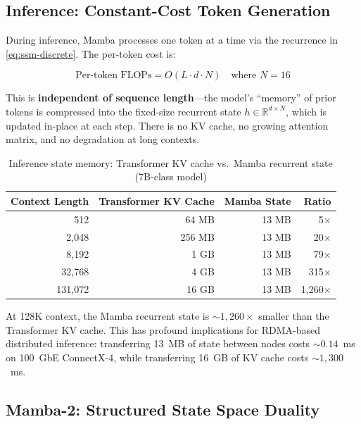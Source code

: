 \documentclass[11pt,letterpaper]{article}
\begin{document}
\subsection{Inference: Constant-Cost Token Generation}

During inference, Mamba processes one token at a time via the recurrence in \cref{eq:ssm-discrete}. The per-token cost is:

\begin{equation}
    \text{Per-token FLOPs} = O(L \cdot d \cdot N) \quad \text{where } N = 16
    \label{eq:mamba-cost}
\end{equation}

This is \textbf{independent of sequence length}---the model's ``memory'' of prior tokens is compressed into the fixed-size recurrent state $h \in \mathbb{R}^{d \times N}$, which is updated in-place at each step. There is no KV cache, no growing attention matrix, and no degradation at long contexts.

\begin{table}[htbp]
\centering
\caption{Inference state memory: Transformer KV cache vs.\ Mamba recurrent state (7B-class model)}
\label{tab:state-memory}
\begin{tabular}{@{}rrrr@{}}
\toprule
\textbf{Context Length} & \textbf{Transformer KV Cache} & \textbf{Mamba State} & \textbf{Ratio} \\
\midrule
512 & 64 MB & 13 MB & 5$\times$ \\
2,048 & 256 MB & 13 MB & 20$\times$ \\
8,192 & 1 GB & 13 MB & 79$\times$ \\
32,768 & 4 GB & 13 MB & 315$\times$ \\
131,072 & 16 GB & 13 MB & 1,260$\times$ \\
\bottomrule
\end{tabular}
\end{table}

At 128K context, the Mamba recurrent state is ${\sim}1{,}260\times$ smaller than the Transformer KV cache. This has profound implications for RDMA-based distributed inference: transferring 13~MB of state between nodes costs ${\sim}0.14$~ms on 100~GbE ConnectX-4, while transferring 16~GB of KV cache costs ${\sim}1{,}300$~ms.

\subsection{Mamba-2: Structured State Space Duality}
\end{document}
